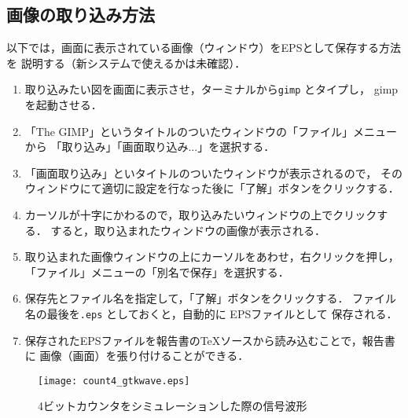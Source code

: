 \documentclass{jarticle}[11pt]
\begin{document}
    \subsection{画像の取り込み方法}
    \label{subsec:画像の取り込み方法}
    以下では，画面に表示されている画像（ウィンドウ）をEPSとして保存する方法を
    説明する（新システムで使えるかは未確認）．
    \begin{enumerate}
    \item 取り込みたい図を画面に表示させ，ターミナルから{\tt gimp} とタイプし，
    gimp を起動させる．
    \item 「The GIMP」というタイトルのついたウィンドウの「ファイル」メニューから
    「取り込み」「画面取り込み...」を選択する．
    \item 「画面取り込み」といタイトルのついたウィンドウが表示されるので，
    そのウィンドウにて適切に設定を行なった後に「了解」ボタンをクリックする．
    \item カーソルが十字にかわるので，取り込みたいウィンドウの上でクリックする．
    すると，取り込まれたウィンドウの画像が表示される．
    \item 取り込まれた画像ウィンドウの上にカーソルをあわせ，右クリックを押し，
    「ファイル」メニューの「別名で保存」を選択する．
    \item 保存先とファイル名を指定して，「了解」ボタンをクリックする．
    ファイル名の最後を{\tt .eps} としておくと，自動的に EPSファイルとして
    保存される．
    \item 保存されたEPSファイルを報告書のTeXソースから読み込むことで，報告書に
    画像（画面）を張り付けることができる．
    \end{enumerate}
     
     
    \begin{figure}[tb]
    \begin{center}
    \texttt{[image: count4\_gtkwave.eps]}
    \caption{4ビットカウンタをシミュレーションした際の信号波形}
    \label{fig:4ビットカウンタをシミュレーションした際の信号波形}
    \end{center}
    \end{figure}
     
    
\end{document}
